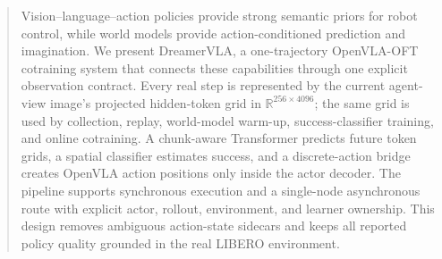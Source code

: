 \begin{abstract}
Vision--language--action policies provide strong semantic priors for robot control,
while world models provide action-conditioned prediction and imagination.  We
present DreamerVLA, a one-trajectory OpenVLA-OFT cotraining system that connects
these capabilities through one explicit observation contract.  Every real step
is represented by the current agent-view image's projected hidden-token grid in
$\mathbb{R}^{256\times4096}$; the same grid is used by collection, replay,
world-model warm-up, success-classifier training, and online cotraining.  A
chunk-aware Transformer predicts future token grids, a spatial classifier
estimates success, and a discrete-action bridge creates OpenVLA action positions
only inside the actor decoder.  The pipeline supports synchronous execution and
a single-node asynchronous route with explicit actor, rollout, environment, and
learner ownership.  This design removes ambiguous action-state sidecars and
keeps all reported policy quality grounded in the real LIBERO environment.
\end{abstract}
